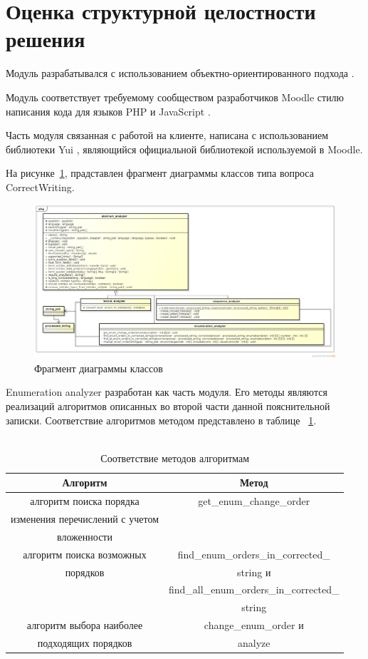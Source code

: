\documentclass[a4paper,english,russian]{G2-105}
\begin{document}
\section{Оценка структурной целостности решения}
\par Модуль разрабатывался с использованием объектно-ориентированного подхода \cite{10,11}. 
\par Модуль соответствует требуемому сообществом разработчиков Moodle стилю написания кода для языков PHP и JavaScript \cite{12,13,14}.
\par Часть модуля связанная с работой на клиенте, написана с использованием библиотеки Yui \cite{15}, являющийся официальной библиотекой используемой в Moodle.
\par На рисунке~\ref{class}, прадставлен фрагмент диаграммы классов типа вопроса CorrectWriting. 
\newpage
\begin{figure}
    \center \includegraphics[width = \linewidth]{class.png}
    \caption{Фрагмент диаграммы классов}
	\label{class}
\end{figure}
\par Enumeration analyzer разработан как часть модуля. Его методы являются реализаций алгоритмов описанных во второй части данной пояснительной записки. Соответствие алгоритмов методом представлено в таблице ~\ref{am}.
\\ \\ \ttl \ttl \ttl\vspace*{14pt}
\begin{longtable}{|c|c|}
    \caption{Соответствие методов алгоритмам }\\ \hline
    \label{am} 
    Алгоритм & Метод \\ \hline \endhead
    алгоритм поиска порядка & get\_enum\_change\_order\\
    изменения перечислений с учетом & \\ 
    вложенности &  \\ \hline
    алгоритм поиска возможных &find\_enum\_orders\_in\_corrected\_ \\
    порядков & string и\\
             & find\_all\_enum\_orders\_in\_corrected\_ \\
             & string\\ \hline
    алгоритм выбора наиболее & change\_enum\_order и \\
    подходящих порядков & analyze\\
\end{longtable}
\end{document}

